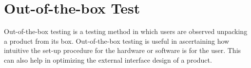 \section{Out-of-the-box Test}
Out-of-the-box testing is a testing method in which users are observed unpacking a product from its box. Out-of-the-box testing is useful in ascertaining how intuitive the set-up procedure for the hardware or software is for the user. This can also help in optimizing the external interface design of a product.